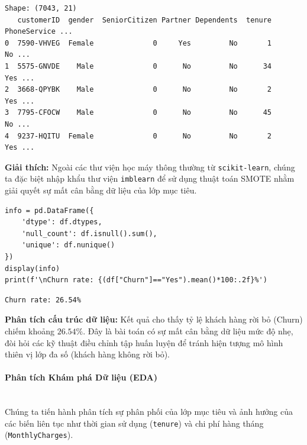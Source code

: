 \begin{lstlisting}[style=consoleoutput, caption={Một vài dòng đầu của tập dữ liệu Telco Churn}]
Shape: (7043, 21)
   customerID  gender  SeniorCitizen Partner Dependents  tenure PhoneService ...
0  7590-VHVEG  Female              0     Yes         No       1           No ...
1  5575-GNVDE    Male              0      No         No      34          Yes ...
2  3668-QPYBK    Male              0      No         No       2          Yes ...
3  7795-CFOCW    Male              0      No         No      45           No ...
4  9237-HQITU  Female              0      No         No       2          Yes ...
\end{lstlisting}

\textbf{Giải thích:} Ngoài các thư viện học máy thông thường từ \texttt{scikit-learn}, chúng ta đặc biệt nhập khẩu thư viện \texttt{imblearn} để sử dụng thuật toán SMOTE nhằm giải quyết sự mất cân bằng dữ liệu của lớp mục tiêu.

\begin{lstlisting}[style=pythoncode, caption={Kiểm tra cấu trúc và phân phối lớp mục tiêu}]
info = pd.DataFrame({
    'dtype': df.dtypes,
    'null_count': df.isnull().sum(),
    'unique': df.nunique()
})
display(info)
print(f'\nChurn rate: {(df["Churn"]=="Yes").mean()*100:.2f}%')
\end{lstlisting}

\begin{lstlisting}[style=consoleoutput, caption={Tỷ lệ khách hàng rời bỏ trong tập dữ liệu}]
Churn rate: 26.54%
\end{lstlisting}

\textbf{Phân tích cấu trúc dữ liệu:} Kết quả cho thấy tỷ lệ khách hàng rời bỏ (Churn) chiếm khoảng $26.54\%$. Đây là bài toán có sự mất cân bằng dữ liệu mức độ nhẹ, đòi hỏi các kỹ thuật điều chỉnh tập huấn luyện để tránh hiện tượng mô hình thiên vị lớp đa số (khách hàng không rời bỏ).

\paragraph{Phân tích Khám phá Dữ liệu (EDA)} \hfill \\

Chúng ta tiến hành phân tích sự phân phối của lớp mục tiêu và ảnh hưởng của các biến liên tục như thời gian sử dụng (\texttt{tenure}) và chi phí hàng tháng (\texttt{MonthlyCharges}).

